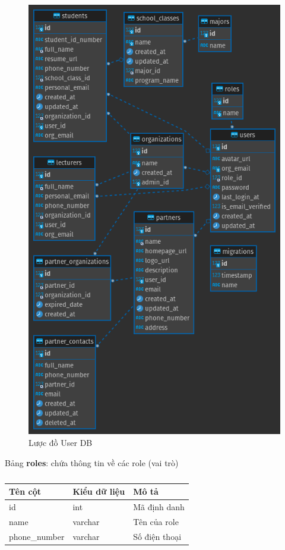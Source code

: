\documentclass[./../main.tex]{subfiles}
\begin{document}
\begin{figure}
	\includegraphics[width=\linewidth]{./images/image3.png}
	\caption{Lược đồ User DB}
	\label{fig:user_db_design}
\end{figure}

Bảng \textbf{roles}: chứa thông tin về các role (vai trò)

\begin{table}[H]
	\caption{}
	\label{tab:db_roles}
	\begin{tabular}{|l|l|l|}
	\hline
	\textbf{Tên cột} & \textbf{Kiểu dữ liệu} & \textbf{Mô tả} \\ \hline
	id               & int                   & Mã định danh   \\ \hline
	name             & varchar               & Tên của role   \\ \hline
	phone\_number    & varchar               & Số điện thoại  \\ \hline
	\end{tabular}
\end{table}
\end{document}
